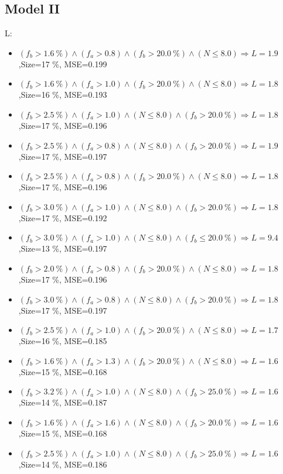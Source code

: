 \documentclass[numbered]{CSL}
\begin{document}
\subsection{Model II}
L:
\begin{itemize}
\item $(f_b > 1.6~\%) \land (f_a > 0.8) \land (f_b > 20.0~\%) \land (N \leq 8.0) \Rightarrow L = 1.9$,\hfill Size=17 \%, MSE=0.199
\item $(f_b > 1.6~\%) \land (f_a > 1.0) \land (f_b > 20.0~\%) \land (N \leq 8.0) \Rightarrow L = 1.8$,\hfill Size=16 \%, MSE=0.193
\item $(f_b > 2.5~\%) \land (f_a > 1.0) \land (N \leq 8.0) \land (f_b > 20.0~\%) \Rightarrow L = 1.8$,\hfill Size=17 \%, MSE=0.196
\item $(f_b > 2.5~\%) \land (f_a > 0.8) \land (N \leq 8.0) \land (f_b > 20.0~\%) \Rightarrow L = 1.9$,\hfill Size=17 \%, MSE=0.197
\item $(f_b > 2.5~\%) \land (f_a > 0.8) \land (f_b > 20.0~\%) \land (N \leq 8.0) \Rightarrow L = 1.8$,\hfill Size=17 \%, MSE=0.196
\item $(f_b > 3.0~\%) \land (f_a > 1.0) \land (N \leq 8.0) \land (f_b > 20.0~\%) \Rightarrow L = 1.8$,\hfill Size=17 \%, MSE=0.192
\item $(f_b > 3.0~\%) \land (f_a > 1.0) \land (N \leq 8.0) \land (f_b \leq 20.0~\%) \Rightarrow L = 9.4$,\hfill Size=13 \%, MSE=0.197
\item $(f_b > 2.0~\%) \land (f_a > 0.8) \land (f_b > 20.0~\%) \land (N \leq 8.0) \Rightarrow L = 1.8$,\hfill Size=17 \%, MSE=0.196
\item $(f_b > 3.0~\%) \land (f_a > 0.8) \land (N \leq 8.0) \land (f_b > 20.0~\%) \Rightarrow L = 1.8$,\hfill Size=17 \%, MSE=0.197
\item $(f_b > 2.5~\%) \land (f_a > 1.0) \land (f_b > 20.0~\%) \land (N \leq 8.0) \Rightarrow L = 1.7$,\hfill Size=16 \%, MSE=0.185
\item $(f_b > 1.6~\%) \land (f_a > 1.3) \land (f_b > 20.0~\%) \land (N \leq 8.0) \Rightarrow L = 1.6$,\hfill Size=15 \%, MSE=0.168
\item $(f_b > 3.2~\%) \land (f_a > 1.0) \land (N \leq 8.0) \land (f_b > 25.0~\%) \Rightarrow L = 1.6$,\hfill Size=14 \%, MSE=0.187
\item $(f_b > 1.6~\%) \land (f_a > 1.6) \land (N \leq 8.0) \land (f_b > 20.0~\%) \Rightarrow L = 1.6$,\hfill Size=15 \%, MSE=0.168
\item $(f_b > 2.5~\%) \land (f_a > 1.0) \land (N \leq 8.0) \land (f_b > 25.0~\%) \Rightarrow L = 1.6$,\hfill Size=14 \%, MSE=0.186

\end{itemize}
\end{document}
